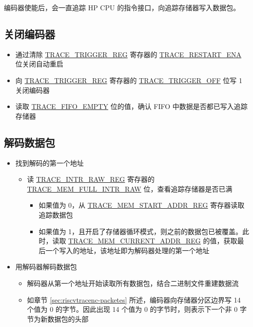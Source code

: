 \documentclass[main\_\_CN.tex]{subfiles}
\begin{document}
编码器使能后，会一直追踪 HP CPU 的指令接口，向追踪存储器写入数据包。

\subsection{关闭编码器}


\begin{itemize}
    \item 通过清除 \hyperref[regdesc:TRACETRIGGERREG]{TRACE\_TRIGGER\_REG} 寄存器的 \hyperref[fielddesc:TRACERESTARTENA]{TRACE\_RESTART\_ENA} 位关闭自动重启

    \item 向 \hyperref[regdesc:TRACETRIGGERREG]{TRACE\_TRIGGER\_REG} 寄存器的 \hyperref[fielddesc:TRACETRIGGEROFF]{TRACE\_TRIGGER\_OFF} 位写 1 关闭编码器

    \item 读取 \hyperref[fielddesc:TRACEFIFOEMPTY]{TRACE\_FIFO\_EMPTY} 位的值，确认 FIFO 中数据是否都已写入追踪存储器

\end{itemize}

\subsection{解码数据包}

\begin{itemize}
    \item 找到解码的第一个地址
        \begin{itemize}
            \item 读 \hyperref[regdesc:TRACEINTRRAWREG]{TRACE\_INTR\_RAW\_REG} 寄存器的 \hyperref[fielddesc:TRACEMEMFULLINTRRAW]{TRACE\_MEM\_FULL\_INTR\_RAW} 位，查看追踪存储器是否已满
            \begin{itemize}
                \item 如果值为 0，从 \hyperref[regdesc:TRACEMEMSTARTADDRREG]{TRACE\_MEM\_START\_ADDR\_REG} 寄存器读取追踪数据包
                \item 如果值为 1，且开启了存储器循环模式，则之前的数据包已被覆盖。此时，读取 \hyperref[regdesc:TRACEMEMCURRENTADDRREG]{TRACE\_MEM\_CURRENT\_ADDR\_REG} 的值，获取最后一个写入的地址，该地址即为解码器处理的第一个地址
            \end{itemize}
        \end{itemize}

    \item 用解码器解码数据包
        \begin{itemize}
            \item 解码器从第一个地址开始读取所有数据包，结合二进制文件重建数据流
            \item 如章节 \ref{sec:riscvtracenc-packetes} 所述，编码器向存储器分区边界写 14 个值为 0 的字节。因此出现 14 个值为 0 的字节时，则表示下一个非 0 字节为新数据包的头部
        \end{itemize}
\end{itemize}
\end{document}
